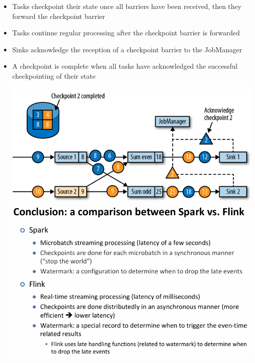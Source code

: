 \documentclass[10pt, landscape]{article}
\begin{document}
\begin{multicols*}{4}
\begin{itemize}
\begin{itemize}
\begin{itemize}
                \item Tasks checkpoint their state once all barriers have been received, then they forward the checkpoint barrier
                \item Tasks continue regular processing after the checkpoint barrier is forwarded
                \item Sinks acknowledge the reception of a checkpoint barrier to the JobManager
                \item A checkpoint is complete when all tasks have acknowledged the successful checkpointing of their state
                \includegraphics[width=0.95\linewidth]{flink_checkpoint_end_acknowledgement.png}
                \includegraphics[width=0.95\linewidth]{flink_vs_spark.png}
              \end{itemize}
        \end{itemize}
\end{itemize}

\end{multicols*}
\end{document}

